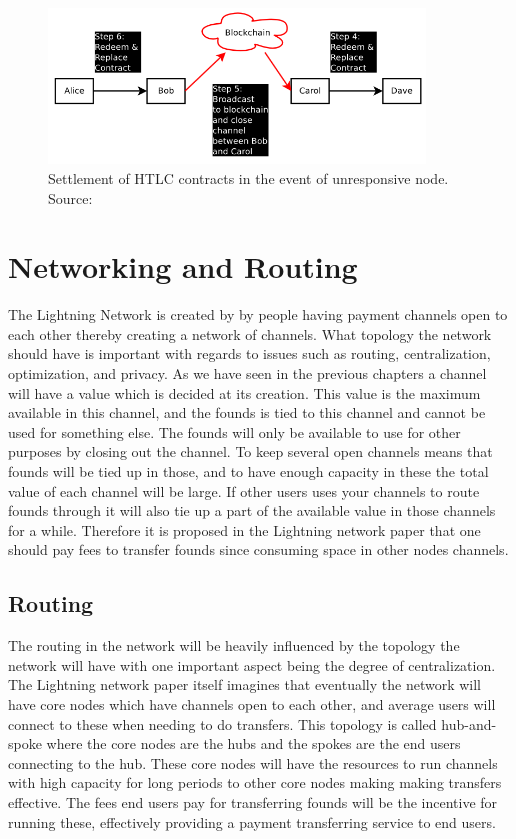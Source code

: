 \documentclass[informationsecurity]{gucmasterproject}
\begin{document}
\begin{figure}[h]
    \centering
    \includegraphics[width=10cm]{figs/htlc_bc.png}
    \caption{ Settlement of HTLC contracts in the event of unresponsive node. Source: \cite{poon2015bitcoin}}
    \label{fig:htlc_bc}
\end{figure}


\let\cleardoublepage\clearpage

\chapter{Networking and Routing}

The Lightning Network is created by by people having payment channels open to each other thereby creating a network of channels. What topology the network should have is important with regards to issues such as routing, centralization, optimization, and privacy.  As we have seen in the previous chapters a channel will have a value which is decided at its creation. This value is the maximum available in this channel, and the founds is tied to this channel and cannot be used for something else. The founds will only be available to use for other purposes by closing out the channel. To keep several open channels means that founds will be tied up in those, and to have enough capacity in these the total value of each channel will be large. If other users uses your channels to route founds through it will also tie up a part of the available value in those channels for a while. Therefore it is proposed in the Lightning network paper\cite{poon2015bitcoin} that one should pay fees to transfer founds since consuming space in other nodes channels. 

\section{Routing}

The routing in the network will be heavily influenced by the topology the network will have with one important aspect being the degree of centralization.
The Lightning network paper itself\cite{poon2015bitcoin} imagines that eventually the network will have core nodes which have channels open to each other, and average users will connect to these when needing to do transfers. This topology is called hub-and-spoke where the core nodes are the hubs and the spokes are the end users connecting to the hub. These core nodes will have the resources to run channels with high capacity for long periods to other core nodes making making transfers effective. The fees end users pay for transferring founds will be the incentive for running these, effectively providing a payment transferring service to end users. 
\end{document}
